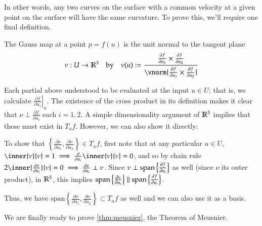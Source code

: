 	
	In other words, any two curves on the surface with a common velocity at a given point on the surface will have the same curvature. To prove this, we'll require one final definition.
	\begin{defn} \label{def:gauss-map}
		The Gauss map at a point $p = f(u)$ is the unit normal to the tangent plane
		\[\nu : U \to \R^3 \quad\textrm{by}\quad  \nu(u) :=
		\frac{\frac{\partial f}{\partial u_1} \times \frac{\partial f}{\partial u_2}}
		{\vnorm{\frac{\partial f}{\partial u_1} \times \frac{\partial f}{\partial u_2}}} \]
	\end{defn}
	Each partial above understood to be evaluated at the input $u \in U$; that is, we calculate $\left.\frac{\partial f}{\partial u_i}\right|_u$.
	The existence of the cross product in its definition makes it clear that $\nu \perp \frac{\partial f}{\partial u_i}$ each $i=1,2$. A simple dimensionality argument of $\mathbb{R}^3$ implies that these must exist in $T_uf$. However, we can also show it directly: 
	
	To show that $\left\{\frac{\partial \nu}{\partial u_1} , \frac{\partial \nu}{\partial u_2}\right\} \in T_u f$,
	first note that at any particular $u \in U$,
	$\inner{\nu}{\nu} = 1 \implies \frac{\partial}{\partial u_i} \inner{\nu}{\nu} = 0$,
	and so by chain rule $2\inner{\frac{\partial \nu}{\partial u_i}}{\nu} = 0
	\implies \frac{\partial \nu}{\partial u_i} \perp \nu $.
	Since $ \nu \perp \mathrm{span}\left\{\frac{\partial f}{\partial u_i}\right\} $ as well (since $\nu$ its outer product), in  $\mathbb{R}^3$, this implies
	$\mathrm{span}\left\{\frac{\partial \nu}{\partial u_i}\right\} \parallel
	\mathrm{span}\left\{\frac{\partial f}{\partial u_i}\right\}$.
	
	Thus, we have $\textrm{span}\left\{ \frac{\partial \nu}{\partial u_1}, \frac{\partial \nu}{\partial u_2}\right\} \subset T_u f$ as well and we can also use it as a basis.
	
	
	We are finally ready to prove \cref{thm:meusnier}, the Theorem of Meusnier.
	
